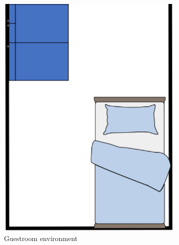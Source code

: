 \begin{figure}[H]
    \centering
    
    \begin{subfigure}{0.35\textwidth}
        \centering
        \includegraphics[width=\linewidth]{figures/Liveroom1.png}
        \caption{Guestroom environment}
        \label{fig:Liveroom1}
    \end{subfigure}
    \hfill
    \begin{subfigure}{0.35\textwidth}
        \centering

\end{subfigure}
\end{figure}
